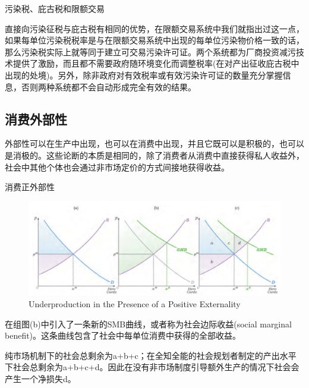\documentclass{article}
\begin{document}
\hspace*{\fill}

污染税、庇古税和限额交易

直接向污染征税与庇古税有相同的优势，在限额交易系统中我们就指出过这一点，如果每单位污染税税率是与在限额交易系统中出现的每单位污染物价格一致的话，那么污染税实际上就等同于建立可交易污染许可证。两个系统都为厂商投资减污技术提供了激励，而且都不需要政府随环境变化而调整税率(在对产出征收庇古税中出现的处境)。另外，除非政府对有效税率或有效污染许可证的数量充分掌握信息，否则两种系统都不会自动形成完全有效的结果。

\subsection{消费外部性}

外部性可以在生产中出现，也可以在消费中出现，并且它既可以是积极的，也可以是消极的。这些论断的本质是相同的，除了消费者从消费中直接获得私人收益外，社会中其他个体也会通过非市场定价的方式间接地获得收益。

\hspace*{\fill}

消费正外部性

\begin{figure}[H] %
	\centering %
	\includegraphics[width=1\textwidth]{21_4} %
	\caption{Underproduction in the Presence of a Positive Externality} %
	\label{Fig.main5} %
\end{figure}

在组图(b)中引入了一条新的SMB曲线，或者称为社会边际收益(social marginal benefit)。这条曲线包含了社会中每单位消费中获得的全部收益。

纯市场机制下的社会总剩余为a+b+c；在全知全能的社会规划者制定的产出水平下社会总剩余为a+b+c+d。因此在没有非市场制度引导额外生产的情况下社会会产生一个净损失d。

\hspace*{\fill}
\end{document}
